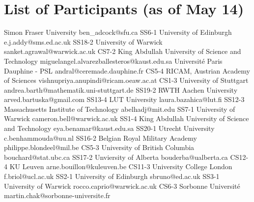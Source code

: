\chapter{List of Participants (as of May 14)}

\setlength{\columnsep}{1cm}

\begin{multicols}{2}

\small


{ Simon Fraser University }
{ ben_adcock@sfu.ca }
{SS6-1}
{}
{ University of Edinburgh }
{ e.j.addy@sms.ed.ac.uk }
{SS18-2}
{}
{ University of Warwick }
{ sanket.agrawal@warwick.ac.uk }
{CS7-2}
{}
{ King Abdullah University of Science and Technology }
{ miguelangel.alvarezballesteros@kaust.edu.sa }
{}
{}
{ Université Paris Dauphine - PSL }
{ andral@ceremade.dauphine.fr }
{CS5-4}
{}
{ RICAM, Austrian Academy of Sciences }
{ vishnupriya.anupindi@ricam.oeaw.ac.at }
{CS1-3}
{}
{ University of Stuttgart }
{ andrea.barth@mathematik.uni-stuttgart.de }
{SS19-2}
{}
{ RWTH Aachen University }
{ arved.bartuska@gmail.com }
{SS13-4}
{}
{ LUT University }
{ laura.bazahica@lut.fi }
{SS12-3}
{}
{ Massachusetts Institute of Technology }
{ abelhadj@mit.edu }
{SS7-1}
{}
{ University of Warwick }
{ cameron.bell@warwick.ac.uk }
{SS1-4}
{}
{ King Abdullah University of Science and Technology }
{ eya.benamar@kaust.edu.sa }
{SS20-1}
{}
{ Utrecht University }
{ c.benhammouda@uu.nl }
{SS16-2}
{}
{ Belgian Royal Military Academy }
{ philippe.blondeel@mil.be }
{CS5-3}
{}
{ University of British Columbia }
{ bouchard@stat.ubc.ca }
{SS17-2}
{}
{ Unviersity of Alberta }
{ bouderba@ualberta.ca }
{CS12-4}
{}
{ KU Leuven }
{ arne.bouillon@kuleuven.be }
{CS11-3}
{}
{ University College London }
{ f.briol@ucl.ac.uk }
{SS2-1}
{}
{ University of Edinburgh }
{ sbruno@ed.ac.uk }
{SS3-1}
{}
{ University of Warwick }
{ rocco.caprio@warwick.ac.uk }
{CS6-3}
{}
{ Sorbonne Université }
{ martin.chak@sorbonne-universite.fr }

\end{multicols}
